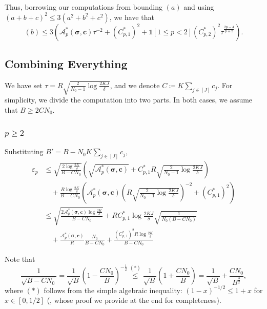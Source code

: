 \documentclass{article}
\def\vc{{\bm{c}}}
\def\gA{{\mathcal{A}}}
\theoremstyle{plain}
\theoremstyle{definition}
\theoremstyle{plain}
\newcommand{\indicator}{\mathds{1}}
\begin{document}
Thus, borrowing our computations from bounding $(a)$ and using $(a + b + c)^2 \leq 3(a^2 + b^2 + c^2)$, we have that
\begin{equation}
    (b) \leq 3 \left( \gA_p^*(\bm\sigma, \vc) \tau^{-2} + (C_{p,1}^*)^2 + \indicator[1 \leq p < 2] (C_{p,2}^*)^2 \tau^{\frac{2p - 4}{p + 2}} \right).
\end{equation}



\subsection{Combining Everything}

We have set $\tau = R \sqrt{\frac{2}{N_0 - 1} \log\frac{2 K J}{\delta}}$, and we denote $C \coloneq K \sum_{j\in[J]} c_j$.
For simplicity, we divide the computation into two parts.
In both cases, we assume that $B \geq 2 C N_0$.

\subsubsection{\texorpdfstring{$p \geq 2$}{p is greater than or equal to 2}}
Substituting $B' = B - N_0 K \sum_{j\in[J]} c_j$,
\begin{align}
    \varepsilon_p &\leq \sqrt{\frac{2 \log\frac{2K}{\delta}}{B - C N_0}} \left( \sqrt{\gA_p^*(\bm\sigma, \vc)} + C_{p,1}^* R \sqrt{\frac{2}{N_0 - 1} \log\frac{2 K J}{\delta}} \right) \\
    &\quad + \frac{R \log\frac{2K}{\delta}}{B - C N_0} \left( \gA_p^*(\bm\sigma, \vc) \left( R \sqrt{\frac{2}{N_0 - 1} \log\frac{2 K J}{\delta}} \right)^{-2} + (C_{p,1}^*)^2 \right) \\
    &\leq \sqrt{\frac{2 \gA_p^*(\bm\sigma, \vc) \log\frac{2K}{\delta}}{B - C N_0}} + R C_{p,1}^* \log\frac{2 K J}{\delta} \sqrt{\frac{1}{N_0(B - C N_0)}} \\
    &\quad + \frac{\gA_p^*(\bm\sigma, \vc)}{R} \frac{N_0}{B - C N_0} + \frac{(C_{p,1}^*)^2 R \log\frac{2K}{\delta}}{B - C N_0}
\end{align}

Note that
\begin{equation}
    \frac{1}{\sqrt{B - C N_0}} = \frac{1}{\sqrt{B}}\left( 1 - \frac{C N_0}{B} \right)^{-\frac{1}{2}}
    \overset{(*)}{\leq} \frac{1}{\sqrt{B}}\left( 1 + \frac{C N_0}{B} \right)
    = \frac{1}{\sqrt{B}} + \frac{C N_0}{B^{\frac{3}{2}}},
\end{equation}
where $(*)$ follows from the simple algebraic inequality: $(1 - x)^{-1/2} \leq 1 + x$ for $x \in [0, 1/2]$ (, whose proof we provide at the end for completeness).
\end{document}
